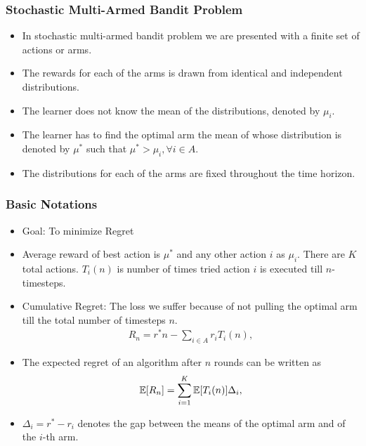 \begin{frame}
\frametitle{Stochastic Multi-Armed Bandit Problem}
\begin{itemize}
\item<1-> In stochastic multi-armed bandit problem we are presented with a finite set of actions or arms. 
\item<2-> The rewards for each of the arms is drawn from identical and independent distributions. 
\item<3-> The learner does not know the mean of the distributions, denoted by $\mu_{i}$. 
\item<4-> The learner has to find the optimal arm the mean of whose distribution is denoted by $\mu^{*}$ such that $\mu^{*}> \mu_{i}, \forall i\in A$.
\item<5-> The distributions for each of the arms are fixed throughout the time horizon. 
\end{itemize}
\end{frame}

\begin{frame}
\frametitle{Basic Notations}
\begin{itemize}
\item<1-> Goal: To minimize Regret
\item<2->  Average reward of best action is $\mu^{*}$ and any other action $i$ as $\mu_{i}$. There are $K$ total actions. $T_{i}(n)$ is number of times tried action $i$ is executed till $n$-timesteps.
\item<3->  Cumulative Regret: The loss we suffer because of not pulling the optimal arm till the total number of timesteps  $n$. 
\begin{align*}
R_{n}=r^{*}n - \sum_{i\in A} r_{i}T_{i}(n),
\end{align*}
\item<4->  The expected regret of an algorithm after $n$ rounds can be written as
\begin{align*}
\mathbb{E}[R_{n}]= \sum_{i=1}^K \mathbb{E}[T_{i}(n)] \Delta_i,
\end{align*}
\item<5-> $\Delta_{i}=r^{*}-r_{i}$ denotes the gap between the means of the optimal arm and of the $i$-th arm. 
\end{itemize}
\end{frame}